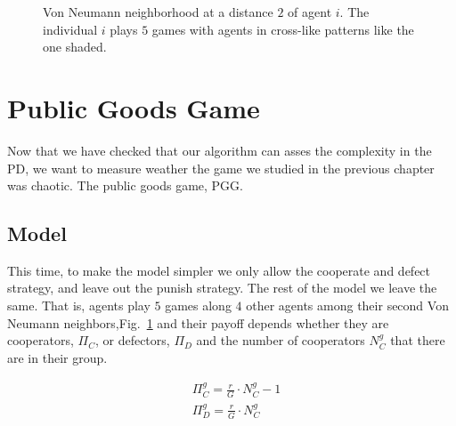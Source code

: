 \begin{figure}
\centering
{}
\caption{Von Neumann neighborhood at a distance $2$ of agent $i$. The individual $i$ plays $5$ games with agents in cross-like patterns like the one shaded.}
\label{fig:VonNeumman2Neigh}
\end{figure}



\section{Public Goods Game}

Now that we have checked that our algorithm can asses the complexity in the PD, we want to measure weather the game we studied in the previous chapter was chaotic. The public goods game, PGG. 

\subsection{Model}

This time, to make the model simpler we only allow the cooperate and defect strategy, and leave out the punish strategy. The rest of the model we leave the same. That is, agents play $5$ games along $4$ other agents among their second Von Neumann neighbors,Fig.~\ref{fig:VonNeumman2Neigh} and their payoff depends whether they are cooperators, $\Pi_C$, or defectors, $\Pi_D$ and the number of cooperators $N_C^g$ that there are in their group.

\begin{equation}
    \begin{split}
    	&\Pi_C^g=\frac{r}{G}\cdot N_C^g-1 \\
    	&\Pi_D^g=\frac{r}{G}\cdot N_C^g
    \end{split}    
\end{equation}


